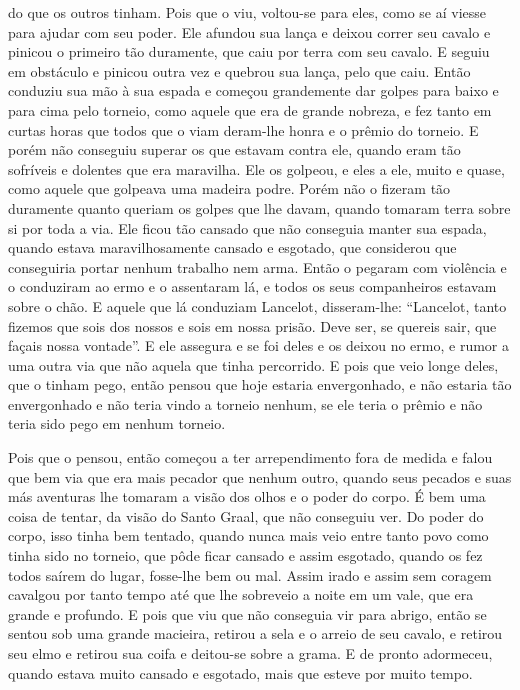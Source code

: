 do que os outros tinham. Pois que o viu, voltou-se para eles, como se aí viesse
para ajudar com seu poder. Ele afundou sua lança e deixou correr seu cavalo e
pinicou o primeiro tão duramente, que caiu por terra com seu cavalo. E seguiu
em obstáculo e pinicou outra vez e quebrou sua lança, pelo que caiu. Então
conduziu sua mão à sua espada e começou grandemente dar golpes para baixo e para
cima pelo torneio, como aquele que era de grande nobreza, e fez tanto em curtas
horas que todos que o viam deram-lhe honra e o prêmio do torneio. E porém não
conseguiu superar os que estavam contra ele, quando eram tão sofríveis e
dolentes que era maravilha. Ele os golpeou, e eles a ele, muito e quase, como
aquele que golpeava uma madeira podre. Porém não o fizeram tão duramente quanto
queriam os golpes que lhe davam, quando tomaram terra sobre si por toda a via.
Ele ficou tão cansado que não conseguia manter sua espada, quando estava
maravilhosamente cansado e esgotado, que considerou que conseguiria portar
nenhum trabalho nem arma. Então o pegaram com violência e o conduziram ao ermo
e o assentaram lá, e todos os seus companheiros estavam sobre o chão. E aquele
que lá conduziam Lancelot, disseram-lhe: “Lancelot, tanto fizemos que sois
dos nossos e sois em nossa prisão. Deve ser, se quereis sair, que façais nossa
vontade”. E ele assegura e se foi deles e os deixou no ermo, e rumor a uma
outra via que não aquela que tinha percorrido. E pois que veio longe deles, que
o tinham pego, então pensou que hoje estaria envergonhado, e não estaria tão
envergonhado e não teria vindo a torneio nenhum, se ele teria o prêmio e não
teria sido pego em nenhum torneio. 

Pois que o pensou, então começou a ter arrependimento fora de medida e falou que
bem via que era mais pecador que nenhum outro, quando seus pecados e suas más
aventuras lhe tomaram a visão dos olhos e o poder do corpo. É bem uma coisa de
tentar, da visão do Santo Graal, que não conseguiu ver. Do poder do corpo, isso
tinha bem tentado, quando nunca mais veio entre tanto povo como tinha sido no
torneio, que pôde ficar cansado e assim esgotado, quando os fez todos saírem do
lugar, fosse-lhe bem ou mal. Assim irado e assim sem coragem cavalgou por tanto
tempo até que lhe sobreveio a noite em um vale, que era grande e profundo. E
pois que viu que não conseguia vir para abrigo, então se sentou sob uma grande
macieira, retirou a sela e o arreio de seu cavalo, e retirou seu elmo e retirou
sua coifa e deitou-se sobre a grama. E de pronto adormeceu, quando estava muito
cansado e esgotado, mais que esteve por muito tempo. 

